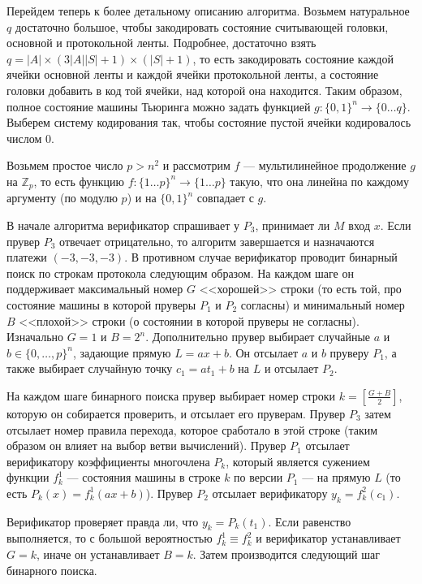 \documentclass[14pt, a4paper, russian]{report}
\begin{document}
        Перейдем теперь к более детальному описанию алгоритма. Возьмем натуральное $q$ достаточно большое, чтобы закодировать состояние считывающей головки, основной и протокольной ленты. Подробнее, достаточно взять $q = |A| \times (3|A||S| + 1) \times (|S| + 1)$, то есть закодировать состояние каждой ячейки основной ленты и каждой ячейки протокольной ленты, а состояние головки добавить в код той ячейки, над которой она находится. Таким образом, полное состояние машины Тьюринга можно задать функцией $g: \{0, 1\}^n \longrightarrow \{0\ldots q\}$. Выберем систему кодирования так, чтобы состояние пустой ячейки кодировалось числом 0.

        Возьмем простое число $p > n^2$ и рассмотрим $f$ --- мультилинейное продолжение $g$ на $\mathbb{Z}_p$, то есть функцию $f: \{1\ldots p\}^n \longrightarrow \{1 \ldots p\}$ такую, что она линейна по каждому аргументу (по модулю $p$) и на $\{0, 1\}^n$ совпадает с $g$.

        В начале алгоритма верификатор спрашивает у $P_3$, принимает ли $M$ вход $x$. Если прувер $P_3$ отвечает отрицательно, то алгоритм завершается и назначаются платежи $(-3, -3, -3)$.
        В противном случае верификатор проводит бинарный поиск по строкам протокола следующим образом. На каждом шаге он поддерживает максимальный номер $G$ <<хорошей>> строки (то есть той, про состояние машины в которой пруверы $P_1$ и $P_2$ согласны) и минимальный номер $B$ <<плохой>> строки (о состоянии в которой пруверы не согласны). Изначально $G=1$ и $B=2^n$. Дополнительно прувер выбирает случайные $a$ и $b \in \{0, \ldots, p\}^n$, задающие прямую $L=ax + b$. Он отсылает $a$ и $b$ пруверу $P_1$, а также выбирает случайную точку $c_1 = a t_1 + b$ на $L$ и отсылает $P_2$.

        На каждом шаге бинарного поиска прувер выбирает номер строки $k = \left[\frac{G + B}{2}\right]$, которую он собирается проверить, и отсылает его пруверам. Прувер $P_3$ затем отсылает номер правила перехода, которое сработало в этой строке (таким образом он влияет на выбор ветви вычислений).
        Прувер $P_1$ отсылает верификатору коэффициенты многочлена $P_k$, который является сужением функции $f^1_k$ --- состояния машины в строке $k$ по версии $P_1$ --- на прямую $L$ (то есть $P_k(x) = f^1_k(ax + b)$). Прувер $P_2$ отсылает верификатору $y_k = f^2_k(c_1)$.

        Верификатор проверяет правда ли, что $y_k = P_k(t_1)$. Если равенство выполняется, то с большой вероятностью $f^1_k \equiv f^2_k$ и верификатор устанавливает $G = k$, иначе он устанавливает $B = k$. Затем производится следующий шаг бинарного поиска.
\end{document}
